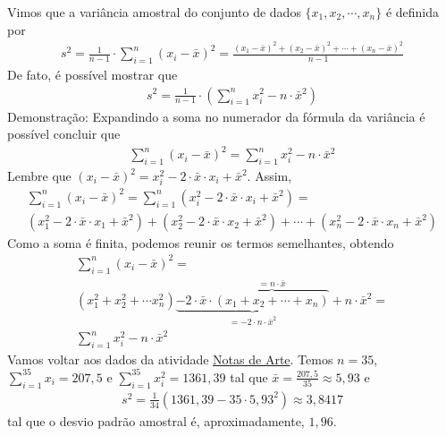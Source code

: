 Vimos que a variância amostral do conjunto de dados \(\{x_1,x_2,\cdots,x_n\}\) é definida por
\begin{equation*}
\begin{split}s^2 = \frac{1}{n-1}\cdot \sum^n_{i=1} (x_i-\bar{x})^2=\frac{(x_1-\bar{x})^2+(x_2-\bar{x})^2+\cdots+(x_n-\bar{x})^2}{n-1}\end{split}
\end{equation*}
De fato, é possível mostrar que
\begin{equation*}
\begin{split}s^2 = \frac{1}{n-1}\cdot \left (\sum^n_{i=1} x^2_i-n\cdot \bar{x}^2\right )\end{split}
\end{equation*}
Demonstração:  Expandindo a soma no numerador da fórmula da variância é possível concluir que
\begin{equation*}
\begin{split}\sum^n_{i=1}(x_i-\bar{x})^2= \sum^n_{i=1} x^2_i -n\cdot \bar{x}^2\end{split}
\end{equation*}
Lembre que \((x_i-\bar{x})^2=x^2_i-2\cdot \bar{x}\cdot x_i+\bar{x}^2\). Assim,
\begin{equation*}
\begin{split} \sum^n_{i=1}(x_i-\bar{x})^2=\sum^n_{i=1}(x^2_i-2\cdot \bar{x}\cdot x_i+\bar{x}^2)=\\ (x^2_1-2\cdot\bar{x}\cdot x_1+\bar{x}^2)+(x^2_2-2\cdot\bar{x}\cdot x_2+\bar{x}^2)+ \cdots + (x^2_n-2\cdot\bar{x}\cdot x_n+\bar{x}^2)\end{split}
\end{equation*}
Como a soma é finita, podemos reunir os termos semelhantes, obtendo
\needspace{10em}
\begin{equation*}
\begin{split}\sum^n_{i=1}(x_i-\bar{x})^2= \\ (x^2_1+x^2_2+\cdots x^2_n)\underbrace{-2\cdot \bar{x}\cdot \overbrace{(x_1+x_2+\cdots+x_n)}^{=n\cdot \bar{x}}}_{=-2\cdot n\cdot \bar{x}^2}+n\cdot \bar{x}^2= \\ \sum^n_{i=1} x^2_i-n\cdot\bar{x}^2\end{split}
\end{equation*}
Vamos voltar aos dados da atividade \hyperref[\detokenize{PE104-0:ativ-notas-de-artes}]{Notas de Arte}. Temos \(n=35\), \(\displaystyle{\sum^{35}_{i=1}}x_i=207{,}5\) e \(\displaystyle{\sum^{35}_{i=1}}x^2_i=1361{,}39\)  tal que \(\bar{x}=\frac{207{,}5}{35}\approx 5{,}93\) e
\begin{equation*}
\begin{split}s^2=\frac{1}{34}\left ( 1361{,}39-35\cdot 5{,}93^2\right )\approx 3{,}8417\end{split}
\end{equation*}
tal que o desvio padrão amostral é, aproximadamente, $1{,}96$.

